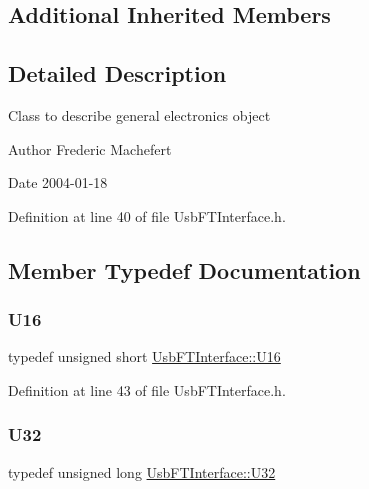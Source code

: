 \subsection*{Additional Inherited Members}


\subsection{Detailed Description}
Class to describe general electronics object

\begin{DoxyAuthor}{Author}
Frederic Machefert 
\end{DoxyAuthor}
\begin{DoxyDate}{Date}
2004-\/01-\/18 
\end{DoxyDate}


Definition at line 40 of file Usb\+F\+T\+Interface.\+h.



\subsection{Member Typedef Documentation}
\mbox{\label{classUsbFTInterface_a51f8cba75a1b8eb42ba2c6ba3841f80f}} 
\subsubsection{\texorpdfstring{U16}{U16}}
{\footnotesize\ttfamily typedef unsigned short \hyperlink{classUsbFTInterface_a51f8cba75a1b8eb42ba2c6ba3841f80f}{Usb\+F\+T\+Interface\+::\+U16}}



Definition at line 43 of file Usb\+F\+T\+Interface.\+h.

\mbox{\label{classUsbFTInterface_aee2201fe4d977aa03568fa8dbacc39ba}} 
\subsubsection{\texorpdfstring{U32}{U32}}
{\footnotesize\ttfamily typedef unsigned long \hyperlink{classUsbFTInterface_aee2201fe4d977aa03568fa8dbacc39ba}{Usb\+F\+T\+Interface\+::\+U32}}



